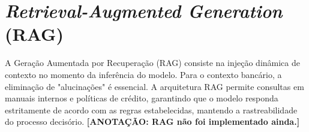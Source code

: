 \section{\textit{Retrieval-Augmented Generation} (RAG)}
A Geração Aumentada por Recuperação (RAG) consiste na injeção dinâmica de contexto no momento da inferência do modelo. Para o contexto bancário, a eliminação de "alucinações" é essencial. A arquitetura RAG permite consultas em manuais internos e políticas de crédito, garantindo que o modelo responda estritamente de acordo com as regras estabelecidas, mantendo a rastreabilidade do processo decisório.
\textbf{[ANOTAÇÃO: RAG não foi implementado ainda.]}

